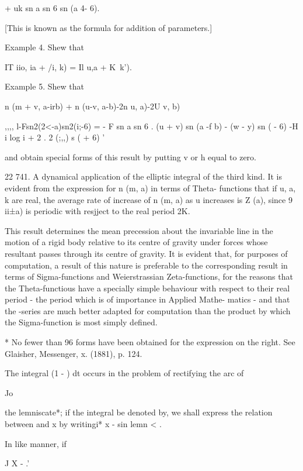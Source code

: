 + uk sn a sn 6 sn (a 4- 6).

 [This is known as the formula for addition of parameters.]

Example 4. Shew that

IT iio, ia + /i, k) = Il u,a + K\ k'). 

Example 5. Shew that

n (m + v, a-irb) + n (u-v, a-b)-2n u, a)-2U v, b)

,,,, l-Fsn2(2<-a)sn2(i;-6) = - F sn a sn 6 . (u + v) sn (a -f b) -
(w - y) sn ( - 6) -H i log i + 2 . 2 (;,,) s ( + 6) '

and obtain special forms of this result by putting v or h equal to
zero. 

22 741. A dynamical application of the elliptic integral of the third
kind. It is evident from the expression for n (m, a) in terms of
Theta- functions that if u, a, k are real, the average rate of
increase of n (m, a) as u increases is Z (a), since 9 ii±a) is
periodic with resjject to the real period 2K.

This result determines the mean precession about the invariable line
in the motion of a rigid body relative to its centre of gravity under
forces whose resultant passes through its centre of gravity. It is
evident that, for purposes of computation, a result of this nature is
preferable to the corresponding result in terms of Sigma-functions and
Weierstrassian Zeta-functions, for the reasons that the
Theta-functious have a specially simple behaviour with respect to
their real period - the period which is of importance in Applied
Mathe- matics - and that the -series are much better adapted for
computation than the product by which the Sigma-function is most
simply defined.

* No fewer than 96 forms have been obtained for the expression on the
right. See Glaisher, Messenger, x. (1881), p. 124.

%
%


The integral (1 - ) dt occurs in the problem of rectifying the arc of

Jo

the lemniscate*; if the integral be denoted by, we shall express the
relation between and x by writingi* x - sin lemn < .

In like manner, if

J X - .'

